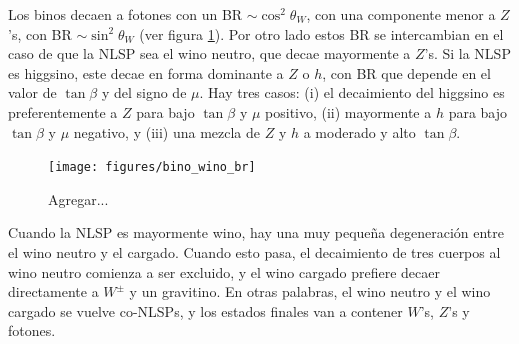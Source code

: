 Los binos decaen a fotones con un BR $\sim \cos^2\theta_W$, con una
componente menor a $Z$'s, con BR $\sim \sin^2\theta_W$ (ver figura
\cref{fig:bino_wino_br}). Por otro lado estos BR se intercambian en el
caso de que la NLSP sea el wino neutro, que decae mayormente a $Z$'s.
Si la NLSP es higgsino, este decae en forma dominante a $Z$ o $h$, con
BR que depende en el valor de $\tan\beta$ y del signo de $\mu$. Hay
tres casos: (i) el decaimiento del higgsino es preferentemente a $Z$
para bajo $\tan\beta$ y $\mu$ positivo, (ii) mayormente a $h$ para
bajo $\tan\beta$ y $\mu$ negativo, y (iii) una mezcla de $Z$ y $h$ a
moderado y alto $\tan\beta$.

\begin{figure}[h]
  \centering
  \texttt{[image: figures/bino\_wino\_br]}
  \caption{Agregar...}
  \label{fig:bino_wino_br}
\end{figure}



Cuando la NLSP es mayormente wino, hay una muy pequeña degeneración
entre el wino neutro y el cargado. Cuando esto pasa, el decaimiento de
tres cuerpos al wino neutro comienza a ser excluido, y el wino cargado
prefiere decaer directamente a $W^{\pm}$ y un gravitino. En otras
palabras, el wino neutro y el wino cargado se vuelve co-NLSPs, y los
estados finales van a contener $W$'s, $Z$'s y fotones.

